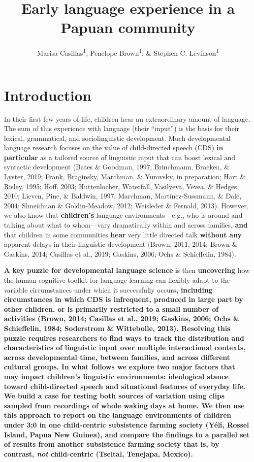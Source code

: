\documentclass[,man,floatsintext]{apa6}
\affiliation{
\vspace{0.5cm}
\textsuperscript{1} Max Planck Institute for Psycholinguistics}
\title{Early language experience in a Papuan community}
\author{Marisa Casillas\textsuperscript{1}, Penelope Brown\textsuperscript{1},
\& Stephen C. Levinson\textsuperscript{1}}
\date{}
\begin{document}
\maketitle

\section{Introduction}\label{intro}

In their first few years of life, children hear an extraordinary amount
of language. The sum of this experience with language (their
\enquote{input}) is the basis for their lexical, grammatical, and
sociolinguistic development. Much developmental language research
focuses on the value of child-directed speech (CDS) \textbf{in
particular} as a tailored source of linguistic input that can boost
lexical and syntactic development (Bates \& Goodman, 1997; Brinchmann,
Braeken, \& Lyster, 2019; Frank, Braginsky, Marchman, \& Yurovsky, in
preparation; Hart \& Risley, 1995; Hoff, 2003; Huttenlocher, Waterfall,
Vasilyeva, Vevea, \& Hedges, 2010; Lieven, Pine, \& Baldwin, 1997;
Marchman, Martínez-Sussmann, \& Dale, 2004; Shneidman \& Goldin-Meadow,
2012; Weisleder \& Fernald, 2013). However, we also know that
\textbf{children's} language environments---e.g., who is around and
talking about what to whom---vary dramatically within and across
families, \textbf{and} that children in some communities \textbf{hear}
very little directed talk \textbf{without any} apparent delays in their
linguistic development (Brown, 2011, 2014; Brown \& Gaskins, 2014;
Casillas et al., 2019; Gaskins, 2006; Ochs \& Schieffelin, 1984).

\textbf{A key puzzle for developmental language science} is then
\textbf{uncovering} how the human cognitive toolkit for language
learning can flexibly adapt to the variable circumstances under which it
successfully occurs\textbf{, including circumstances in which CDS is
infrequent, produced in large part by other children, or is primarily
restricted to a small number of activities (Brown, 2014; Casillas et
al., 2019; Gaskins, 2006; Ochs \& Schieffelin, 1984; Soderstrom \&
Wittebolle, 2013). Resolving this puzzle requires researchers to find
ways to track the distribution and characteristics of linguistic input
over multiple interactional contexts, across developmental time, between
families, and across different cultural groups. In what follows we
explore two major factors that may impact children's linguistic
environments: ideological stance toward child-directed speech and
situational features of everyday life. We build a case for testing both
sources of variation using clips sampled from recordings of whole waking
days at home. We then use this approach to report on the language
environments of children under 3;0 in one child-centric subsistence
farming society (Yélî, Rossel Island, Papua New Guinea), and compare the
findings to a parallel set of results from another subsistence farming
society that is, by contrast, \emph{not} child-centric (Tseltal,
Tenejapa, Mexico).}
\end{document}
